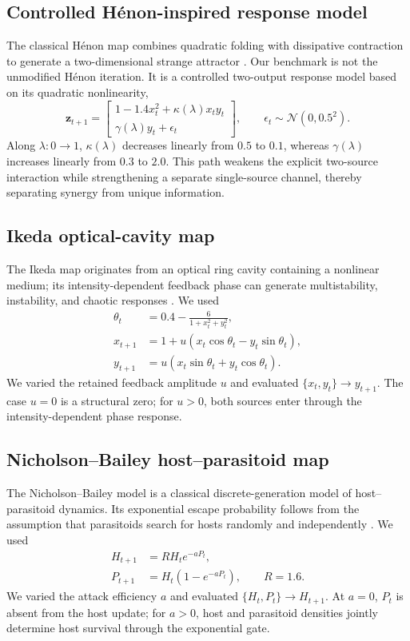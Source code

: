\documentclass[fleqn,10pt]{wlscirep}
\begin{document}
\subsection{Controlled H\'enon-inspired response model}

The classical H\'enon map combines quadratic folding with dissipative contraction to generate a two-dimensional strange attractor \cite{henon1976mapping}. Our benchmark is not the unmodified H\'enon iteration. It is a controlled two-output response model based on its quadratic nonlinearity,
\begin{equation}
\mathbf{z}_{t+1}=
\begin{bmatrix}
1-1.4x_t^2+\kappa(\lambda)x_ty_t\\
\gamma(\lambda)y_t+\epsilon_t
\end{bmatrix},
\qquad \epsilon_t\sim\mathcal{N}(0,0.5^2).
\end{equation}
Along $\lambda:0\rightarrow1$, $\kappa(\lambda)$ decreases linearly from $0.5$ to $0.1$, whereas $\gamma(\lambda)$ increases linearly from $0.3$ to $2.0$. This path weakens the explicit two-source interaction while strengthening a separate single-source channel, thereby separating synergy from unique information.

\subsection{Ikeda optical-cavity map}

The Ikeda map originates from an optical ring cavity containing a nonlinear medium; its intensity-dependent feedback phase can generate multistability, instability, and chaotic responses \cite{ikeda1979multiple}. We used
\begin{align}
\theta_t &= 0.4-\frac{6}{1+x_t^2+y_t^2},\\
x_{t+1} &= 1+u(x_t\cos\theta_t-y_t\sin\theta_t),\\
y_{t+1} &= u(x_t\sin\theta_t+y_t\cos\theta_t).
\end{align}
We varied the retained feedback amplitude $u$ and evaluated $\{x_t,y_t\}\rightarrow y_{t+1}$. The case $u=0$ is a structural zero; for $u>0$, both sources enter through the intensity-dependent phase response.

\subsection{Nicholson--Bailey host--parasitoid map}

The Nicholson--Bailey model is a classical discrete-generation model of host--parasitoid dynamics. Its exponential escape probability follows from the assumption that parasitoids search for hosts randomly and independently \cite{nicholson1935balance}. We used
\begin{align}
H_{t+1} &= R H_t e^{-aP_t},\\
P_{t+1} &= H_t\left(1-e^{-aP_t}\right),
\qquad R=1.6.
\end{align}
We varied the attack efficiency $a$ and evaluated $\{H_t,P_t\}\rightarrow H_{t+1}$. At $a=0$, $P_t$ is absent from the host update; for $a>0$, host and parasitoid densities jointly determine host survival through the exponential gate.
\end{document}
